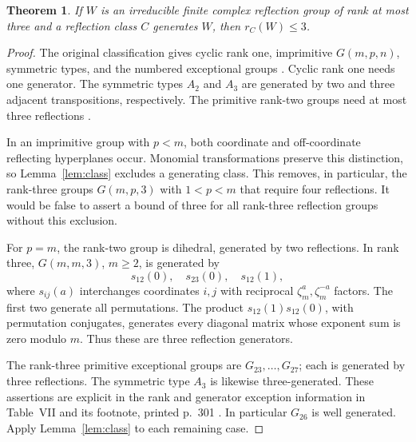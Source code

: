 \documentclass[11pt]{article}
\newtheorem{theorem}[lemma]{Theorem}
\begin{document}
\begin{theorem}\label{thm:lowrank}
If $W$ is an irreducible finite complex reflection group of rank at
most three and a reflection class $C$ generates $W$, then $r_C(W)\le3$.
\end{theorem}
\begin{proof}
The original classification gives cyclic rank one, imprimitive
$G(m,p,n)$, symmetric types, and the numbered exceptional groups
\cite[Sections~2--4 and Table~VII]{st54}.
Cyclic rank one needs one generator. The symmetric types $A_2$ and
$A_3$ are generated by two and three adjacent transpositions, respectively.
The primitive rank-two groups need at most three reflections
\cite[printed p.~280]{st54}.

In an imprimitive group with $p<m$, both coordinate and
off-coordinate reflecting hyperplanes occur. Monomial transformations
preserve this distinction, so Lemma~\ref{lem:class} excludes a
generating class. This removes, in particular, the rank-three groups
$G(m,p,3)$ with $1<p<m$ that require four reflections.
It would be false to assert a bound of three for all rank-three
reflection groups without this exclusion.

For $p=m$, the rank-two group is dihedral, generated by two
reflections. In rank three, $G(m,m,3)$, $m\ge2$, is generated by
\[
                       s_{12}(0),\quad s_{23}(0),\quad s_{12}(1),
\]
where $s_{ij}(a)$ interchanges coordinates $i,j$ with reciprocal
$\zeta_m^a,\zeta_m^{-a}$ factors.
The first two generate all permutations. The product
$s_{12}(1)s_{12}(0)$, with permutation conjugates, generates every
diagonal matrix whose exponent sum is zero modulo $m$.
Thus these are three reflection generators.

The rank-three primitive exceptional groups are $G_{23},\ldots,G_{27}$;
each is generated by three reflections. The symmetric type $A_3$
is likewise three-generated. These assertions are explicit in the
rank and generator exception information in Table~VII and its
footnote, printed p.~301 \cite{st54}.
In particular $G_{26}$ is well generated.
Apply Lemma~\ref{lem:class} to each remaining case.
\end{proof}
\end{document}
